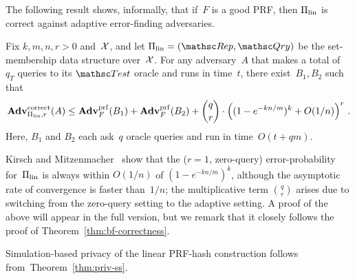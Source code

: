 

 The following result shows, informally, that
if~$F$ is a good PRF, then $\Pi_{\mathrm{lin}}$ is correct
against adaptive error-finding adversaries.


\begin{theorem}%
\label{thm1}\label{thm:lin-correctness} Fix $k,m,n,r>0$ and~${\cal X}$,
and let $\setprim_{\mathrm{lin}}= (\Rep, \Qry)$ be the
set-membership data structure over~${\cal X}$.  For any adversary~$A$
that makes a total of~$q_T$ queries to its $\Test$ oracle and runs
in time~$t$, there exist~$B_1,B_2$ such that
\[
\mathrm{\mathbf{Adv}}^{\mathrm{correct}}_{\Pi_{\mathrm{lin}},r}(A) \leq  \mathbf{Adv}^{\mathrm{prf}}_{F}(B_1) + \mathbf{Adv}^{\mathrm{prf}}_{F}(B_2)  +{\dbinom{q}{r}} \cdot \left( (1-e^{-kn/m})^k + O(1/n) \right)^r\,.
\]
Here, $B_1$ and $B_2$ each ask~$q$ oracle queries and run in
time~$O(t+qm)$.
\end{theorem}
Kirsch and Mitzenmacher~\cite{kirsch2006less} show that the ($r=1$,
zero-query) error-probability for~$\Pi_\mathrm{lin}$ is always
within $O(1/n)$ of $(1-e^{-kn/m})^k$, although the asymptotic rate
of convergence is faster than~$1/n$; the multiplicative term
$\binom{q}{r}$ arises due to switching from the zero-query setting
to the adaptive setting. A proof of the above will appear in the
full version, but we remark that it closely follows the proof of
Theorem~\ref{thm:bf-correctness}.
%


 Simulation-based privacy of the linear PRF-hash
construction follows from~Theorem~\ref{thm:priv-ss}.

